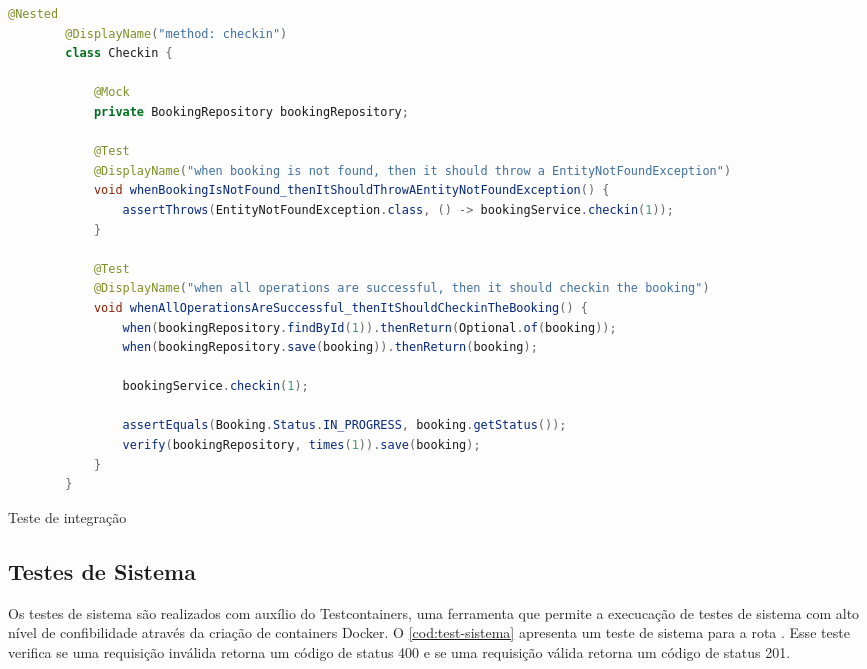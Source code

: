 \begin{codigo}[H]
    \begin{lstlisting}[language=Java]
        @Nested
        @DisplayName("method: checkin")
        class Checkin {

            @Mock
            private BookingRepository bookingRepository;

            @Test
            @DisplayName("when booking is not found, then it should throw a EntityNotFoundException")
            void whenBookingIsNotFound_thenItShouldThrowAEntityNotFoundException() {
                assertThrows(EntityNotFoundException.class, () -> bookingService.checkin(1));
            }

            @Test
            @DisplayName("when all operations are successful, then it should checkin the booking")
            void whenAllOperationsAreSuccessful_thenItShouldCheckinTheBooking() {
                when(bookingRepository.findById(1)).thenReturn(Optional.of(booking));
                when(bookingRepository.save(booking)).thenReturn(booking);

                bookingService.checkin(1);

                assertEquals(Booking.Status.IN_PROGRESS, booking.getStatus());
                verify(bookingRepository, times(1)).save(booking);
            }
        }
    \end{lstlisting}
    \caption{Teste de integração}
    \label{cod:test-integracao}
\end{codigo}

\subsection{Testes de Sistema}
Os testes de sistema são realizados com auxílio do Testcontainers, uma ferramenta que permite a execucação de testes de sistema com alto nível de confibilidade através da criação de containers Docker. O \autoref{cod:test-sistema} apresenta um teste de sistema para a rota . Esse teste verifica se uma requisição inválida retorna um código de status 400 e se uma requisição válida retorna um código de status 201.

